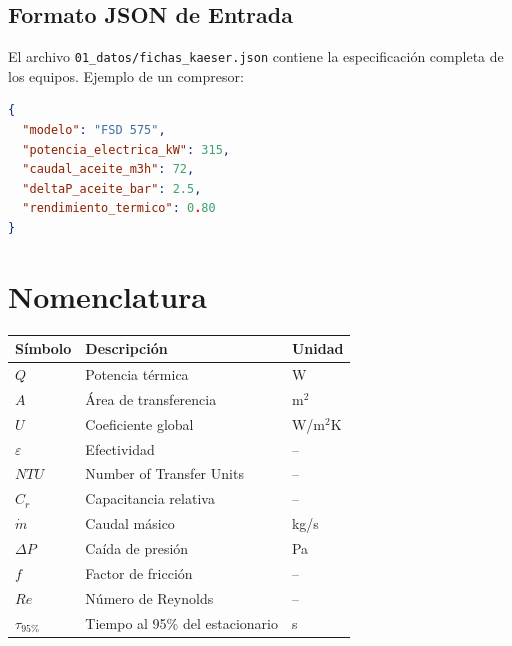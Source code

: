 \documentclass[11pt,a4paper]{report}
\begin{document}
\section{Formato JSON de Entrada}

El archivo \texttt{01\_datos/fichas\_kaeser.json} contiene la especificación completa de los equipos. Ejemplo de un compresor:

\begin{lstlisting}[language=json]
{
  "modelo": "FSD 575",
  "potencia_electrica_kW": 315,
  "caudal_aceite_m3h": 72,
  "deltaP_aceite_bar": 2.5,
  "rendimiento_termico": 0.80
}
\end{lstlisting}

\chapter{Nomenclatura}

\begin{table}[H]
\centering
\begin{tabular}{@{}lll@{}}
\toprule
\textbf{Símbolo} & \textbf{Descripción} & \textbf{Unidad} \\
\midrule
$Q$ & Potencia térmica & W \\
$A$ & Área de transferencia & m$^2$ \\
$U$ & Coeficiente global & W/m$^2$K \\
$\varepsilon$ & Efectividad & -- \\
$NTU$ & Number of Transfer Units & -- \\
$C_r$ & Capacitancia relativa & -- \\
$\dot{m}$ & Caudal másico & kg/s \\
$\Delta P$ & Caída de presión & Pa \\
$f$ & Factor de fricción & -- \\
$Re$ & Número de Reynolds & -- \\
$\tau_{95\%}$ & Tiempo al 95\% del estacionario & s \\
\bottomrule
\end{tabular}
\end{table}

\end{document}
